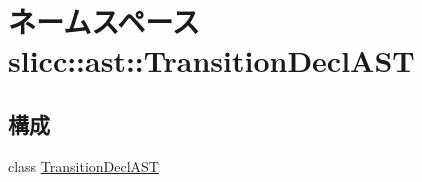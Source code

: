 \hypertarget{namespaceslicc_1_1ast_1_1TransitionDeclAST}{
\section{ネームスペース slicc::ast::TransitionDeclAST}
\label{namespaceslicc_1_1ast_1_1TransitionDeclAST}
}
\subsection*{構成}
\begin{DoxyCompactItemize}
\item 
class \hyperlink{classslicc_1_1ast_1_1TransitionDeclAST_1_1TransitionDeclAST}{TransitionDeclAST}
\end{DoxyCompactItemize}

